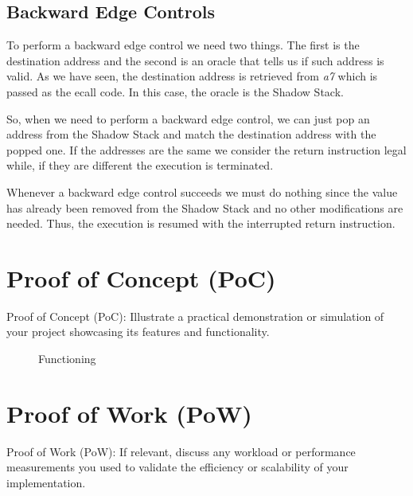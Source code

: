 \subsection{Backward Edge Controls}
\label{subsec:backward}

To perform a backward edge control we need two things. The first is the
destination address and the second is an oracle that tells us if such address is
valid. As we have seen, the destination address is retrieved from \textit{a7} which
is passed as the ecall code. In this case, the oracle is the Shadow Stack.

So, when we need to perform a backward edge control, we can just pop an address from
the Shadow Stack and match the destination address with the popped one. If the
addresses are the same we consider the return instruction legal while, if they are
different the execution is terminated.

Whenever a backward edge control succeeds we must do nothing since the value has
already been removed from the Shadow Stack and no other modifications are needed.
Thus, the execution is resumed with the interrupted return instruction.

\section{Proof of Concept (PoC)}
\label{sec:project_poc}

Proof of Concept (PoC): Illustrate a practical demonstration or simulation of your
project showcasing its features and functionality.

\begin{figure}[htbp]
  \centering
  \def\stackalignment{r} %
  {\scriptsize }
  \caption{Functioning}
  \label{fig:functioning}
\end{figure}

\section{Proof of Work (PoW)}
\label{sec:project_pow}

Proof of Work (PoW): If relevant, discuss any workload or performance measurements
you used to validate the efficiency or scalability of your implementation.